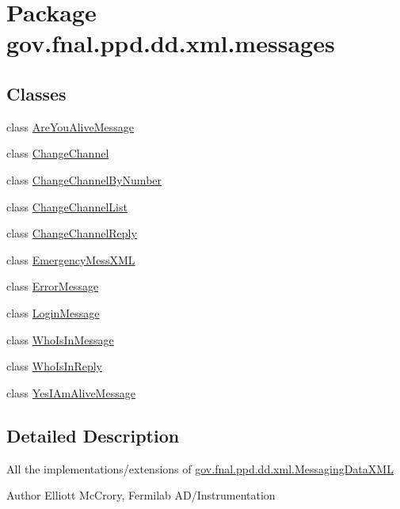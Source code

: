\hypertarget{namespacegov_1_1fnal_1_1ppd_1_1dd_1_1xml_1_1messages}{\section{Package gov.\-fnal.\-ppd.\-dd.\-xml.\-messages}
\label{namespacegov_1_1fnal_1_1ppd_1_1dd_1_1xml_1_1messages}
}
\subsection*{Classes}
\begin{DoxyCompactItemize}
\item 
class \hyperlink{classgov_1_1fnal_1_1ppd_1_1dd_1_1xml_1_1messages_1_1AreYouAliveMessage}{Are\-You\-Alive\-Message}
\item 
class \hyperlink{classgov_1_1fnal_1_1ppd_1_1dd_1_1xml_1_1messages_1_1ChangeChannel}{Change\-Channel}
\item 
class \hyperlink{classgov_1_1fnal_1_1ppd_1_1dd_1_1xml_1_1messages_1_1ChangeChannelByNumber}{Change\-Channel\-By\-Number}
\item 
class \hyperlink{classgov_1_1fnal_1_1ppd_1_1dd_1_1xml_1_1messages_1_1ChangeChannelList}{Change\-Channel\-List}
\item 
class \hyperlink{classgov_1_1fnal_1_1ppd_1_1dd_1_1xml_1_1messages_1_1ChangeChannelReply}{Change\-Channel\-Reply}
\item 
class \hyperlink{classgov_1_1fnal_1_1ppd_1_1dd_1_1xml_1_1messages_1_1EmergencyMessXML}{Emergency\-Mess\-X\-M\-L}
\item 
class \hyperlink{classgov_1_1fnal_1_1ppd_1_1dd_1_1xml_1_1messages_1_1ErrorMessage}{Error\-Message}
\item 
class \hyperlink{classgov_1_1fnal_1_1ppd_1_1dd_1_1xml_1_1messages_1_1LoginMessage}{Login\-Message}
\item 
class \hyperlink{classgov_1_1fnal_1_1ppd_1_1dd_1_1xml_1_1messages_1_1WhoIsInMessage}{Who\-Is\-In\-Message}
\item 
class \hyperlink{classgov_1_1fnal_1_1ppd_1_1dd_1_1xml_1_1messages_1_1WhoIsInReply}{Who\-Is\-In\-Reply}
\item 
class \hyperlink{classgov_1_1fnal_1_1ppd_1_1dd_1_1xml_1_1messages_1_1YesIAmAliveMessage}{Yes\-I\-Am\-Alive\-Message}
\end{DoxyCompactItemize}


\subsection{Detailed Description}
All the implementations/extensions of \hyperlink{classgov_1_1fnal_1_1ppd_1_1dd_1_1xml_1_1MessagingDataXML}{gov.\-fnal.\-ppd.\-dd.\-xml.\-Messaging\-Data\-X\-M\-L}

\begin{DoxyAuthor}{Author}
Elliott Mc\-Crory, Fermilab A\-D/\-Instrumentation 
\end{DoxyAuthor}
